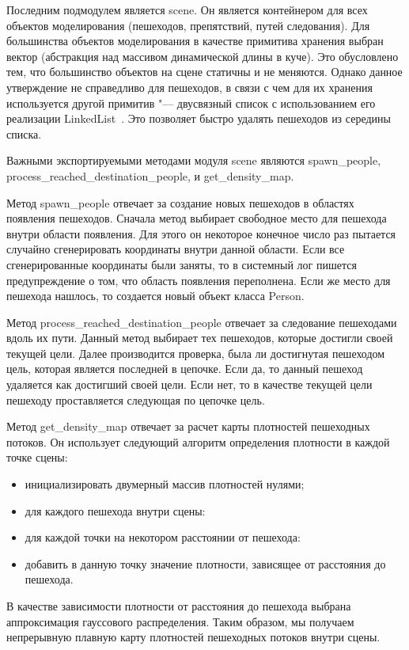 Последним подмодулем является scene.
Он является контейнером для всех объектов моделирования (пешеходов, препятствий, путей следования).
Для большинства объектов моделирования в качестве примитива хранения выбран вектор (абстракция над массивом динамической длины в куче).
Это обусловлено тем, что большинство объектов на сцене статичны и не меняются.
Однако данное утверждение не справедливо для пешеходов, в связи с чем для их хранения используется другой примитив "---
двусвязный список с использованием его реализации LinkedList~\cite{rust_linked_list_cargo}. Это позволяет быстро удалять пешеходов из середины списка.

Важными экспортируемыми методами модуля scene являются spa\-wn\_peo\-ple, pro\-cess\_reach\-ed\_des\-ti\-na\-ti\-on\_people, и get\_den\-si\-ty\_map.

Метод spawn\_people отвечает за создание новых пешеходов в областях появления пешеходов.
Сначала метод выбирает свободное место для пешехода внутри области появления.
Для этого он некоторое конечное число раз пытается случайно сгенерировать координаты внутри данной области.
Если все сгенерированные координаты были заняты, то в системный лог пишется предупреждение о том, что область появления переполнена.
Если же место для пешехода нашлось, то создается новый объект класса Person.

Метод process\_reached\_destination\_people отвечает за следование пешеходами вдоль их пути.
Данный метод выбирает тех пешеходов, которые достигли своей текущей цели.
Далее производится проверка, была ли достигнутая пешеходом цель, которая является последней в цепочке.
Если да, то данный пешеход удаляется как достигший своей цели. Если нет, то в качестве текущей цели пешеходу проставляется следующая по цепочке цель.

Метод get\_density\_map отвечает за расчет карты плотностей пешеходных потоков.
Он использует следующий алгоритм определения плотности в каждой точке сцены:
\begin{itemize}
  \item инициализировать двумерный массив плотностей нулями;
  \item для каждого пешехода внутри сцены:
  \item для каждой точки на некотором расстоянии от пешехода:
  \item добавить в данную точку значение плотности, зависящее от расстояния до пешехода.
\end{itemize}

В качестве зависимости плотности от расстояния до пешехода выбрана аппроксимация гауссового распределения.
Таким образом, мы получаем непрерывную плавную карту плотностей пешеходных потоков внутри сцены.

